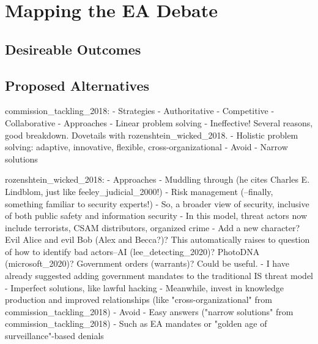 
\section{Mapping the EA Debate}

\subsection{Desireable Outcomes}


\subsection{Proposed Alternatives}



commission_tackling_2018:
- Strategies
  - Authoritative
  - Competitive
  - Collaborative
- Approaches
  - Linear problem solving
    - Ineffective! Several reasons, good breakdown. Dovetails with rozenshtein_wicked_2018.
  - Holistic problem solving: adaptive, innovative, flexible, cross-organizational
- Avoid
  - Narrow solutions

rozenshtein_wicked_2018:
- Approaches
  - Muddling through (he cites Charles E. Lindblom, just like feeley_judicial_2000!)
  - Risk management (--finally, something familiar to security experts!)
    - So, a broader view of security, inclusive of both public safety and information security
    - In this model, threat actors now include terrorists, CSAM distributors, organized crime
      - Add a new character? Evil Alice and evil Bob (Alex and Becca?)? This automatically raises to question of how to
          identify bad actors--AI (lee_detecting_2020)? PhotoDNA (microsoft_2020)? Government orders (warrants)? Could
          be useful.
    - I have already suggested adding government mandates to the traditional IS threat model
  - Imperfect solutions, like lawful hacking
  - Meanwhile, invest in knowledge production and improved relationships (like "cross-organizational" from
      commission_tackling_2018)
- Avoid
  - Easy answers ("narrow solutions" from commission_tackling_2018)
    - Such as EA mandates or "golden age of surveillance"-based denials

